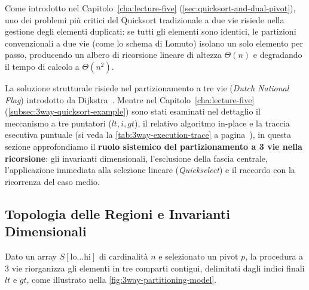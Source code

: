 Come introdotto nel Capitolo~\ref{cha:lecture-five} (\autoref{sec:quicksort-and-dual-pivot}), uno dei problemi più critici del Quicksort tradizionale a due vie risiede nella gestione degli elementi duplicati: se tutti gli elementi sono identici, le partizioni convenzionali a due vie (come lo schema di Lomuto) isolano un solo elemento per passo, producendo un albero di ricorsione lineare di altezza $\Theta(n)$ e degradando il tempo di calcolo a $\Theta(n^2)$.

La soluzione strutturale risiede nel partizionamento a tre vie (\textit{Dutch National Flag}) introdotto da Dijkstra~\cite{dijkstra1976}. Mentre nel Capitolo~\ref{cha:lecture-five} (\autoref{subsec:3way-quicksort-example}) sono stati esaminati nel dettaglio il meccanismo a tre puntatori ($lt, i, gt$), il relativo algoritmo in-place e la traccia esecutiva puntuale (si veda la \autoref{tab:3way-execution-trace} a pagina~\pageref{tab:3way-execution-trace}), in questa sezione approfondiamo il \textbf{ruolo sistemico del partizionamento a 3 vie nella ricorsione}: gli invarianti dimensionali, l'esclusione della fascia centrale, l'applicazione immediata alla selezione lineare (\textit{Quickselect}) e il raccordo con la ricorrenza del caso medio.
\FloatBarrier

\subsection{Topologia delle Regioni e Invarianti Dimensionali}
\label{subsec:3way-invariants-dimensional}

Dato un array $S[\text{lo} \dots \text{hi}]$ di cardinalità $n$ e selezionato un pivot $p$, la procedura a 3 vie riorganizza gli elementi in tre comparti contigui, delimitati dagli indici finali $lt$ e $gt$, come illustrato nella \autoref{fig:3way-partitioning-model}.

